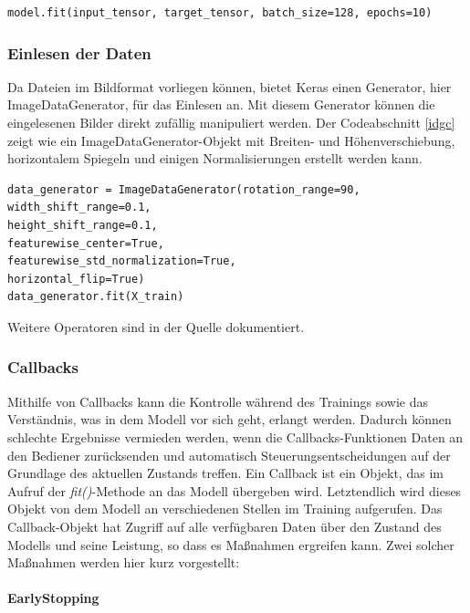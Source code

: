 \begin{lstlisting}[caption={Das Starten des Trainings mit der \textit{fit()}-Methode\cite{francois}.}, label=tkc]
model.fit(input_tensor, target_tensor, batch_size=128, epochs=10)
\end{lstlisting}


\subsubsection{Einlesen der Daten}
Da Dateien im Bildformat vorliegen können, bietet Keras einen Generator, hier ImageDataGenerator, für das Einlesen an. Mit diesem Generator können die eingelesenen Bilder direkt zufällig manipuliert werden\cite{Vasilev2019}. Der Codeabschnitt \ref{idgc} zeigt wie ein ImageDataGenerator-Objekt mit Breiten- und Höhenverschiebung, horizontalem Spiegeln und einigen Normalisierungen erstellt werden kann. 


\begin{lstlisting}[caption={Vorverarbeitung der Bilder mit der \textbf{ImageDataGenerator}-Klasse\cite{Vasilev2019}.}, label=idgc]
data_generator = ImageDataGenerator(rotation_range=90,
width_shift_range=0.1,
height_shift_range=0.1,
featurewise_center=True,
featurewise_std_normalization=True,
horizontal_flip=True)
data_generator.fit(X_train)
\end{lstlisting}

Weitere Operatoren sind in der Quelle\cite{keras_doc} dokumentiert.

\subsubsection{Callbacks}

Mithilfe von Callbacks kann die Kontrolle während des Trainings sowie das Verständnis, was in dem Modell vor sich geht, erlangt werden. Dadurch können schlechte Ergebnisse vermieden werden, wenn die Callbacks-Funktionen Daten an den Bediener zurücksenden und automatisch Steuerungsentscheidungen auf der Grundlage des aktuellen Zustands treffen. Ein Callback ist ein Objekt, das im Aufruf der \textit{fit()}-Methode an das Modell übergeben wird. Letztendlich wird dieses Objekt von dem Modell an verschiedenen Stellen im Training aufgerufen. Das Callback-Objekt hat Zugriff auf alle verfügbaren Daten über den Zustand des Modells und seine Leistung, so dass es Maßnahmen ergreifen kann. Zwei solcher Maßnahmen werden hier kurz vorgestellt\cite{francois}:

\paragraph{EarlyStopping}
~\newline

